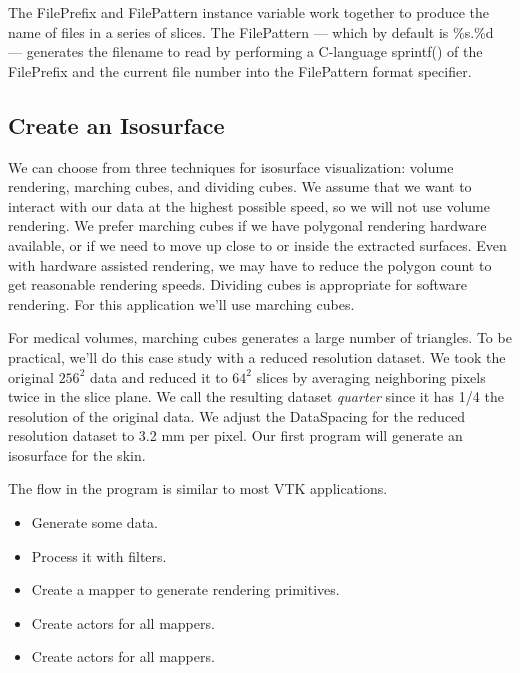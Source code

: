\noindent The FilePrefix and FilePattern instance variable work together to produce the name of files in a series of slices. The FilePattern --- which by default is \%s.\%d --- generates the filename to read by performing a C-language sprintf() of the FilePrefix and the current file number into the FilePattern format specifier.

\subsection{Create an Isosurface}

We can choose from three techniques for isosurface visualization: volume rendering, marching cubes, and dividing cubes. We assume that we want to interact with our data at the highest possible speed, so we will not use volume rendering. We prefer marching cubes if we have polygonal rendering hardware available, or if we need to move up close to or inside the extracted surfaces. Even with hardware assisted rendering, we may have to reduce the polygon count to get reasonable rendering speeds. Dividing cubes is appropriate for software rendering. For this application we'll use marching cubes.

For medical volumes, marching cubes generates a large number of triangles. To be practical,  we'll do this case study with a reduced resolution dataset. We took the original $256^2$ data and reduced it to $64^2$ slices by averaging neighboring pixels twice in the slice plane. We call the resulting dataset \emph{quarter} since it has 1/4 the resolution of the original data. We adjust the DataSpacing for the reduced resolution dataset to 3.2 mm per pixel. Our first program will generate an isosurface for the skin.

The flow in the program is similar to most VTK applications.

\begin{itemize}

    \item Generate some data.

    \item Process it with filters.

    \item Create a mapper to generate rendering primitives.

    \item Create actors for all mappers.

    \item Create actors for all mappers.

\end{itemize}

